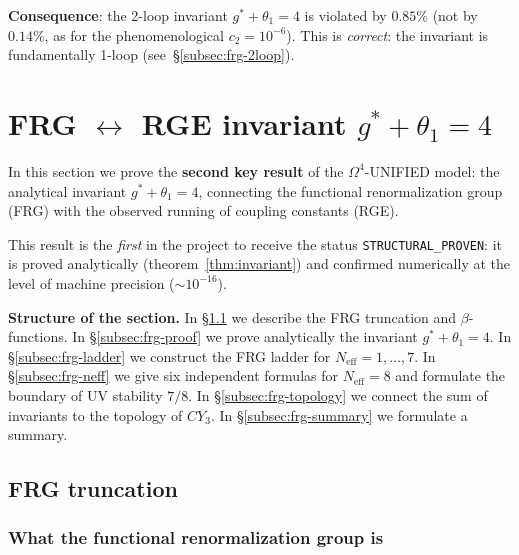 \documentclass[11pt,a4paper]{article}
\newcommand{\CY}{\ensuremath{CY_3}}
\newcommand{\Om}{\ensuremath{\Omega^4}}
\theoremstyle{definition}
\begin{document}
\medskip\noindent
\textbf{Consequence}: the 2-loop invariant $g^* + \theta_1 = 4$
is violated by $0.85\%$ (not by $0.14\%$, as for the phenomenological
$c_2 = 10^{-6}$). This is \emph{correct}: the invariant is fundamentally
1-loop (see~\S\ref{subsec:frg-2loop}).

\section{FRG \texorpdfstring{$\leftrightarrow$}{to} RGE invariant \texorpdfstring{$g^* + \theta_1 = 4$}{g* + theta1 = 4}}
\label{sec:frg-rge}

In this section we prove the \textbf{second key result}
of the $\Om$-UNIFIED model: the analytical invariant $g^* + \theta_1 = 4$,
connecting the functional renormalization group (FRG) with the observed
running of coupling constants (RGE).

This result is the \emph{first} in the project to receive the status
\texttt{STRUCTURAL\_PROVEN}: it is proved analytically
(theorem~\ref{thm:invariant}) and confirmed numerically
at the level of machine precision ($\sim 10^{-16}$).

\medskip\noindent
\textbf{Structure of the section.}
In \S\ref{subsec:frg-setup} we describe the FRG truncation and
$\beta$-functions.
In \S\ref{subsec:frg-proof} we prove analytically the invariant
$g^* + \theta_1 = 4$.
In \S\ref{subsec:frg-ladder} we construct the FRG ladder for
$N_{\text{eff}} = 1, \ldots, 7$.
In \S\ref{subsec:frg-neff} we give six independent formulas
for $N_{\text{eff}} = 8$ and formulate the boundary
of UV stability $7/8$.
In \S\ref{subsec:frg-topology} we connect the sum of invariants
to the topology of $\CY$.
In \S\ref{subsec:frg-summary} we formulate a summary.

\subsection{FRG truncation}
\label{subsec:frg-setup}

\subsubsection{What the functional renormalization group is}
\end{document}
